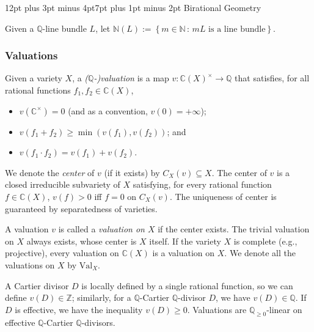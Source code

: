 \documentclass[11pt, oneside]{amsart}
\makeatletter
\def\mid{\,:\,} %
\def\{{\mathopen{}\left\lbrace} \def\}{\right\rbrace\mathclose{}}
\newcommand{\<}{\left\langle} \renewcommand{\>}{\right\rangle}
\renewcommand{\subsection}{\@startsection{subsection}{2}{\z@}%
  {12pt plus 3pt minus 4pt}{7pt plus 1pt minus 2pt}%
  {\normalfont\bfseries}}
\makeatother
\begin{document}
\subsection{Birational Geometry}\label{sec:prelim:bir}



Given a $\mathbb{Q}$-line bundle $L$, let $\mathbb{N}(L) := \{m \in \mathbb{N} \mid m L \text{ is a line bundle}\}$.

\subsubsection{Valuations}\label{sec:prelim:bir:val}

\newcommand{\Val}{\mathrm{Val}}
\newcommand{\DVal}{\mathrm{DivVal}}

Given a variety $X$, a \emph{($\mathbb{Q}$-)valuation} is a map $v : \mathbb{C}(X)^\times \to \mathbb{Q}$ that satisfies, for all rational functions $f_1, f_2 \in \mathbb{C}(X)$,
\begin{itemize}
	\item $v(\mathbb{C}^\times) = 0$ (and as a convention, $v(0) = +\infty$);
	\item $v(f_1 + f_2) \geq \min(v(f_1), v(f_2))$; and
	\item $v(f_1 \cdot f_2) = v(f_1) + v(f_2)$.
\end{itemize}

We denote the \emph{center} of $v$ (if it exists) by $C_X(v) \subseteq X$. The center of $v$ is a closed irreducible subvariety of $X$ satisfying, for every rational function $f \in \mathbb{C}(X)$, $v(f) > 0$ iff $f = 0$ on $C_X(v)$. The uniqueness of center is guaranteed by separatedness of varieties.

A valuation $v$ is called a \emph{valuation on $X$} if the center exists. The trivial valuation on $X$ always exists, whose center is $X$ itself. If the variety $X$ is complete (e.g., projective), every valuation on $\mathbb{C}(X)$ is a valuation on $X$. We denote all the valuations on $X$ by $\Val_X$.

A Cartier divisor $D$ is locally defined by a single rational function, so we can define $v(D) \in \mathbb{Z}$; similarly, for a $\mathbb{Q}$-Cartier $\mathbb{Q}$-divisor $D$, we have $v(D) \in \mathbb{Q}$. If $D$ is effective, we have the inequality $v(D) \geq 0$. Valuations are $\mathbb{Q}_{\geq 0}$-linear on effective $\mathbb{Q}$-Cartier $\mathbb{Q}$-divisors.
\end{document}
